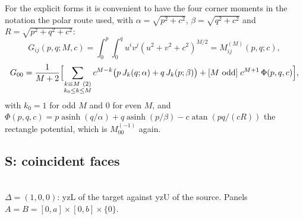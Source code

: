 \documentclass[11pt]{article}
\theoremstyle{remark}
\newcommand{\asinh}{\operatorname{asinh}}
\newcommand{\atan}{\operatorname{atan}}
\newcommand{\geofig}[2]{\begin{center}#1\\[2pt]{\footnotesize #2}\end{center}}
\begin{document}
For the explicit forms it is convenient to have the four corner moments in the notation
the polar route used, with $\alpha = \sqrt{p^2+c^2}$, $\beta = \sqrt{q^2+c^2}$ and
$R = \sqrt{p^2+q^2+c^2}$:
\begin{equation}
G_{ij}(p,q;M,c) = \int_0^p\!\!\int_0^q u^i v^j (u^2+v^2+c^2)^{M/2} = M_{ij}^{(M)}(p,q;c),
\end{equation}
\begin{equation}
G_{00} = \frac{1}{M+2}\Bigl[\sum_{\substack{k\equiv M\ (2)\\ k_0\le k\le M}}
 c^{M-k}\bigl(p\,J_k(q;\alpha) + q\,J_k(p;\beta)\bigr)
 + [M\text{ odd}]\;c^{M+1}\,\Phi(p,q,c)\Bigr],
\label{eq:G00}
\end{equation}
with $k_0 = 1$ for odd $M$ and $0$ for even $M$, and
$\Phi(p,q,c) = p\asinh(q/\alpha) + q\asinh(p/\beta) - c\atan(pq/(cR))$ the rectangle
potential, which is $M_{00}^{(-1)}$ again.

\subsection{S: coincident faces}
\label{sec:S}

\geofig{\figSS}{$\Delta = (1,0,0)$: yzL of the target against yzU of the source. Panels
$A = B = [0,a]\times[0,b]\times\{0\}$.}
\end{document}
